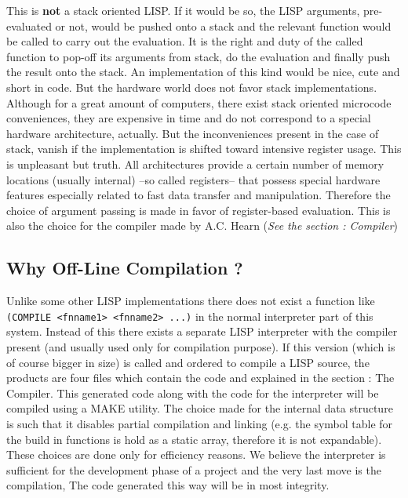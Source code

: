 This is {\bf not} a stack oriented LISP.  If  it  would  be  so,  the  LISP
arguments, pre-evaluated  or  not,  would  be  pushed  onto  a stack and the
relevant function would be called to carry out the evaluation.  It  is  the
right  and duty of the called function to pop-off its arguments from stack,
do  the  evaluation  and  finally  push  the  result  onto  the  stack.  An
implementation  of this kind would be nice, cute and short in code. But the
hardware world does not favor stack implementations. Although for  a  great
amount  of  computers,  there  exist stack oriented microcode conveniences,
they are expensive in time and do not  correspond  to  a  special  hardware
architecture,  actually.  But  the  inconveniences  present  in the case of
stack, vanish if the implementation is shifted  toward  intensive  register
usage.  This  is  unpleasant but truth. All architectures provide a certain
number of memory locations (usually internal) --so called registers--  that
possess  special hardware features especially related to fast data transfer
and manipulation. Therefore the choice of argument passing is made in favor
of register-based evaluation. This is also the choice for the compiler made
by A.C. Hearn ({\em See the section : Compiler})

\subsection{Why Off-Line Compilation ?}
Unlike some other LISP implementations there does not exist a function like
{\tt (COMPILE <fnname1> <fnname2> ...)} in the normal interpreter  part  of
this  system.  Instead of this there exists  a  separate  LISP  interpreter
with  the compiler present (and usually used only for compilation purpose).
If this version (which is of course bigger in size) is called  and  ordered
to compile a LISP source, the products are four files which contain the  \C
code  and  explained  in the section : The Compiler. This generated \C code
along with the \C code for the interpreter will be \C compiled using a MAKE
utility. The choice made for the internal data structure is  such  that  it
disables  partial  compilation  and  linking (e.g. the symbol table for the
build in functions  is  hold  as  a  static  array,  therefore  it  is  not
expandable). These choices are done only for efficiency reasons. We believe
the  interpreter  is  sufficient for the development phase of a project and
the very last move is the compilation, The code generated this way will  be
in most integrity.

